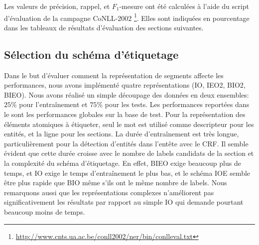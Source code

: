 Les valeurs de précision, rappel, et $F_1$-mesure ont été calculées à l'aide du script d'évaluation de la campagne CoNLL-2002 \footnote{\url{http://www.cnts.ua.ac.be/conll2002/ner/bin/conlleval.txt}}. Elles sont indiquées en pourcentage dans les tableaux de résultats d'évaluation des sections suivantes.

\subsection{Sélection du schéma d'étiquetage}
Dans le but d'évaluer comment la représentation de segments affecte les performances, nous avons implémenté quatre représentations (IO, IEO2, BIO2, BIEO).  Nous avons réalisé un simple découpage des données en deux ensembles: $25 \%$ pour l'entraînement et $75 \%$ pour les tests. Les performances reportées dans le  sont les performances globales sur la base de test. Pour la représentation des 
éléments atomiques à étiqueter, seul le mot est utilisé comme descripteur pour les entités, et la ligne pour les sections. La durée d'entraînement est très longue, particulièrement pour la détection d'entités dans l'entête avec le CRF. Il semble évident que cette durée croisse avec le nombre de labels candidats de la section et la complexité du schéma d'étiquetage. En effet, BIEO exige beaucoup plus de temps, et IO exige le temps d'entraînement le plus bas, et le schéma IOE semble être plus rapide que BIO même s'ils ont le même nombre de labels. Nous remarquons aussi que les représentations complexes n'améliorent pas significativement les résultats par rapport au simple IO qui demande pourtant beaucoup moins de temps.

